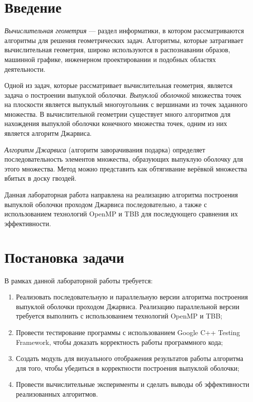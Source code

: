 \documentclass{report}
\begin{document}
\setcounter{page}{2}

\tableofcontents
\newpage

\section*{Введение}
\par \textit{Вычислительная геометрия} — раздел информатики, в котором рассматриваются алгоритмы для решения геометрических задач. Алгоритмы, которые затрагивает вычислительная геометрия, широко используются в распознавании образов, машинной графике, инженерном проектировании и подобных областях деятельности.
\par Одной из задач, которые рассматривает вычислительная геометрия, является задача о построении выпуклой оболочки. \textit{Выпуклой оболочкой} множества точек на плоскости является выпуклый многоугольник с вершинами из точек заданного множества. В вычислительной геометрии существует много алгоритмов для нахождения выпуклой оболочки конечного множества точек, одним из них является алгоритм Джарвиса.
\par \textit{Алгоритм Джарвиса} (алгоритм заворачивания подарка) определяет последовательность элементов множества, образующих выпуклую оболочку для этого множества. Метод можно представить как обтягивание верёвкой множества вбитых в доску гвоздей.
\par Данная лабораторная работа направлена на реализацию алгоритма построения выпуклой оболочки проходом Джарвиса последовательно, а также с использованием технологий OpenMP и TBB для последующего сравнения их эффективности.
\newpage

\section*{Постановка задачи}
\par В рамках данной лабораторной работы требуется:
\begin{enumerate}
\item Реализовать последовательную и параллельную версии алгоритма построения выпуклой оболочки проходом Джарвиса. Реализацию параллельной версии требуется выполнить с использованием технологий OpenMP и TBB;
\item Провести тестирование программы с использованием Google C++ Testing Framework, чтобы доказать корректность работы программного кода;
\item Создать модуль для визуального отображения результатов работы алгоритма для того, чтобы убедиться в корректности построения выпуклой оболочки;
\item Провести вычислительные эксперименты и сделать выводы об эффективности реализованных алгоритмов.
\end{enumerate}
\newpage
\end{document}

